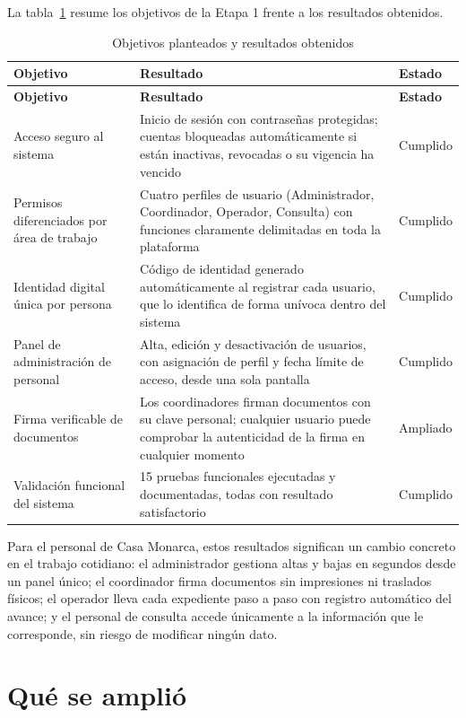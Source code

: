 \documentclass[10pt,letterpaper]{report}
\begin{document}
La tabla~\ref{tab:objetivos} resume los objetivos de la Etapa 1 frente a los resultados obtenidos.

\begin{longtable}{p{} p{} p{}}
\caption{Objetivos planteados y resultados obtenidos}\label{tab:objetivos}\\
\toprule
\textbf{Objetivo} & \textbf{Resultado} & \textbf{Estado}\\
\midrule
\endfirsthead
\toprule
\textbf{Objetivo} & \textbf{Resultado} & \textbf{Estado}\\
\midrule
\endhead
Acceso seguro al sistema &
Inicio de sesión con contraseñas protegidas; cuentas bloqueadas automáticamente si están inactivas, revocadas o su vigencia ha vencido &
Cumplido \\[4pt]
Permisos diferenciados por área de trabajo &
Cuatro perfiles de usuario (Administrador, Coordinador, Operador, Consulta) con funciones claramente delimitadas en toda la plataforma &
Cumplido \\[4pt]
Identidad digital única por persona &
Código de identidad generado automáticamente al registrar cada usuario, que lo identifica de forma unívoca dentro del sistema &
Cumplido \\[4pt]
Panel de administración de personal &
Alta, edición y desactivación de usuarios, con asignación de perfil y fecha límite de acceso, desde una sola pantalla &
Cumplido \\[4pt]
Firma verificable de documentos &
Los coordinadores firman documentos con su clave personal; cualquier usuario puede comprobar la autenticidad de la firma en cualquier momento &
Ampliado \\[4pt]
Validación funcional del sistema &
15 pruebas funcionales ejecutadas y documentadas, todas con resultado satisfactorio &
Cumplido \\
\bottomrule
\end{longtable}

Para el personal de Casa Monarca, estos resultados significan un cambio concreto en el trabajo cotidiano: el administrador gestiona altas y bajas en segundos desde un panel único; el coordinador firma documentos sin impresiones ni traslados físicos; el operador lleva cada expediente paso a paso con registro automático del avance; y el personal de consulta accede únicamente a la información que le corresponde, sin riesgo de modificar ningún dato.

\section{Qué se amplió}
\end{document}

